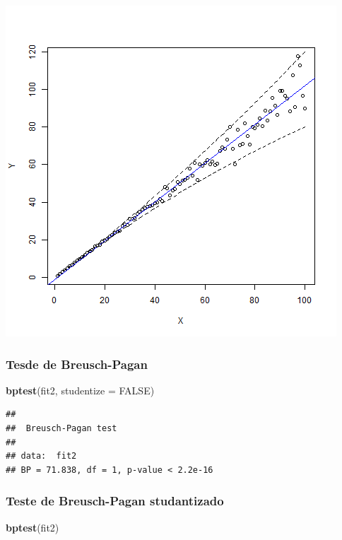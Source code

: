 \documentclass[a4paper, 12pt]{article}
\newenvironment{Shaded}{\begin{snugshade}}{\end{snugshade}}
\newcommand{\DataTypeTok}[1]{\textcolor[rgb]{0.13,0.29,0.53}{#1}}
\newcommand{\KeywordTok}[1]{\textcolor[rgb]{0.13,0.29,0.53}{\textbf{#1}}}
\newcommand{\NormalTok}[1]{#1}
\newcommand{\OtherTok}[1]{\textcolor[rgb]{0.56,0.35,0.01}{#1}}
\begin{document}
\begin{center}\includegraphics[width=0.9\linewidth]{images/hetero2-1} \end{center}

\hypertarget{tesde-de-breusch-pagan-1}{%
\subsubsection{Tesde de Breusch-Pagan}\label{tesde-de-breusch-pagan-1}}

\begin{Shaded}
\begin{Highlighting}[]
\KeywordTok{bptest}\NormalTok{(fit2, }\DataTypeTok{studentize =} \OtherTok{FALSE}\NormalTok{)}
\end{Highlighting}
\end{Shaded}

\begin{verbatim}
## 
##  Breusch-Pagan test
## 
## data:  fit2
## BP = 71.838, df = 1, p-value < 2.2e-16
\end{verbatim}

\hypertarget{teste-de-breusch-pagan-studantizado}{%
\subsubsection{Teste de Breusch-Pagan
studantizado}\label{teste-de-breusch-pagan-studantizado}}

\begin{Shaded}
\begin{Highlighting}[]
\KeywordTok{bptest}\NormalTok{(fit2)}
\end{Highlighting}
\end{Shaded}
\end{document}
